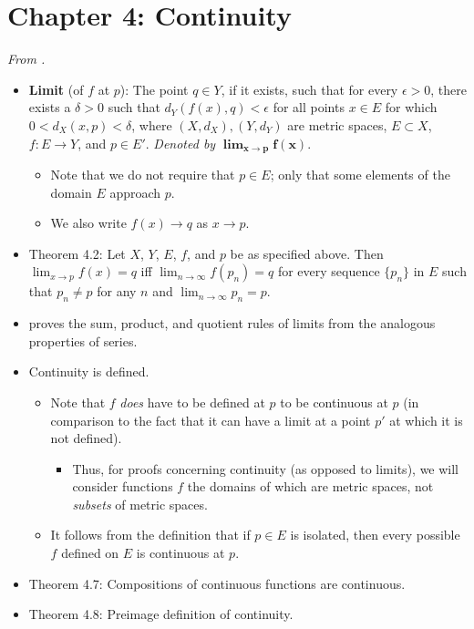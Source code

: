 \documentclass[../../notes.tex]{subfiles}
\begin{document}
\section{Chapter 4: Continuity}
\emph{From \textcite{bib:Rudin}.}
\begin{itemize}
    \item {}\textbf{Limit} (of $f$ at $p$): The point $q\in Y$, if it exists, such that for every $\epsilon>0$, there exists a $\delta>0$ such that $d_Y(f(x),q)<\epsilon$ for all points $x\in E$ for which $0<d_X(x,p)<\delta$, where $(X,d_X),(Y,d_Y)$ are metric spaces, $E\subset X$, $f:E\to Y$, and $p\in E'$. \emph{Denoted by} $\bm{\lim_{x\to p}f(x)}$.
    \begin{itemize}
        \item Note that we do not require that $p\in E$; only that some elements of the domain $E$ approach $p$.
        \item We also write $f(x)\to q$ as $x\to p$.
    \end{itemize}
    \item Theorem 4.2: Let $X$, $Y$, $E$, $f$, and $p$ be as specified above. Then $\lim_{x\to p}f(x)=q$ iff $\lim_{n\to\infty}f(p_n)=q$ for every sequence $\{p_n\}$ in $E$ such that $p_n\neq p$ for any $n$ and $\lim_{n\to\infty}p_n=p$.
    \item \textcite{bib:Rudin} proves the sum, product, and quotient rules of limits from the analogous properties of series.
    \item Continuity is defined.
    \begin{itemize}
        \item Note that $f$ \emph{does} have to be defined at $p$ to be continuous at $p$ (in comparison to the fact that it can have a limit at a point $p'$ at which it is not defined).
        \begin{itemize}
            \item Thus, for proofs concerning continuity (as opposed to limits), we will consider functions $f$ the domains of which are metric spaces, not \emph{subsets} of metric spaces.
        \end{itemize}
        \item It follows from the definition that if $p\in E$ is isolated, then every possible $f$ defined on $E$ is continuous at $p$.
    \end{itemize}
    \item Theorem 4.7: Compositions of continuous functions are continuous.
    \item Theorem 4.8: Preimage definition of continuity.

\end{itemize}
\end{document}
